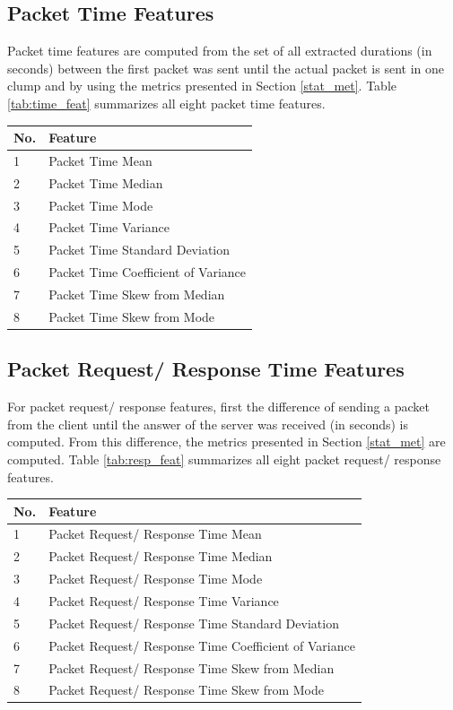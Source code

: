 \subsection{Packet Time Features} \label{pack_time}
Packet time features are computed from the set of all extracted durations (in seconds) between the first packet was sent until the actual packet is sent in one clump and by using the metrics presented in Section \ref{stat_met}. Table \ref{tab:time_feat} summarizes all eight packet time features. 

\begin{center}
\begin{tabular}{ |l|l| }
\hline
No. & Feature \\
\hline
1 & Packet Time Mean \\
\hline
2 & Packet Time Median \\
\hline
3 & Packet Time Mode \\
\hline
4 & Packet Time Variance \\
\hline
5 & Packet Time Standard Deviation \\
\hline
6 & Packet Time Coefficient of Variance \\
\hline
7 & Packet Time Skew from Median \\
\hline
8 & Packet Time Skew from Mode  \\
\hline
\end{tabular}
\label{tab:time_feat}
\end{center}

\subsection{Packet Request/ Response Time Features} \label{pack_resp}
For packet request/ response features, first the difference of sending a packet from the client until the answer of the server was received (in seconds) is computed. From this difference, the metrics presented in Section \ref{stat_met} are computed. Table \ref{tab:resp_feat} summarizes all eight packet request/ response features. 

\begin{center}
\begin{tabular}{ |l|l| }
\hline
No. & Feature \\
\hline
1 & Packet Request/ Response Time Mean \\
\hline
2 & Packet Request/ Response Time Median \\
\hline
3 & Packet Request/ Response Time Mode \\
\hline
4 & Packet Request/ Response Time Variance \\
\hline
5 & Packet Request/ Response Time Standard Deviation \\
\hline
6 & Packet Request/ Response Time Coefficient of Variance \\
\hline
7 & Packet Request/ Response Time Skew from Median \\
\hline
8 & Packet Request/ Response Time Skew from Mode  \\
\hline
\end{tabular}
\label{tab:resp_feat}
\end{center}

